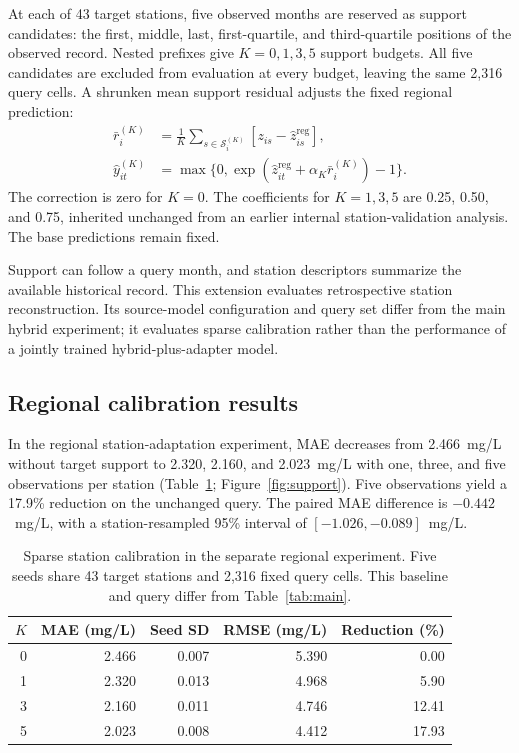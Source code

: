 \documentclass[11pt]{article}
\begin{document}
At each of 43 target stations, five observed months are reserved as support candidates: the first, middle, last, first-quartile, and third-quartile positions of the observed record. Nested prefixes give $K=0,1,3,5$ support budgets. All five candidates are excluded from evaluation at every budget, leaving the same 2,316 query cells. A shrunken mean support residual adjusts the fixed regional prediction:
\begin{align}
 \bar r_i^{(K)}&=\frac{1}{K}\sum_{s\in\mathcal S_i^{(K)}}
       [z_{is}-\hat z_{is}^{\mathrm{reg}}],\\
 \hat y_{it}^{(K)}&=\max\{0,\exp(\hat z_{it}^{\mathrm{reg}}+
                      \alpha_K\bar r_i^{(K)})-1\}.
\end{align}
The correction is zero for $K=0$. The coefficients for $K=1,3,5$ are 0.25, 0.50, and 0.75, inherited unchanged from an earlier internal station-validation analysis. The base predictions remain fixed.

Support can follow a query month, and station descriptors summarize the available historical record. This extension evaluates retrospective station reconstruction. Its source-model configuration and query set differ from the main hybrid experiment; it evaluates sparse calibration rather than the performance of a jointly trained hybrid-plus-adapter model.


\subsection{Regional calibration results}
In the regional station-adaptation experiment, MAE decreases from 2.466~mg/L without target support to 2.320, 2.160, and 2.023~mg/L with one, three, and five observations per station (Table~\ref{tab:support}; Figure~\ref{fig:support}). Five observations yield a 17.9\% reduction on the unchanged query. The paired MAE difference is $-0.442$~mg/L, with a station-resampled 95\% interval of $[-1.026,-0.089]$~mg/L.

\begin{table}[htbp]\centering\small
\caption{Sparse station calibration in the separate regional experiment. Five seeds share 43 target stations and 2,316 fixed query cells. This baseline and query differ from Table~\ref{tab:main}.}
\label{tab:support}
\begin{tabular}{rrrrr}\toprule
$K$ & MAE (mg/L) & Seed SD & RMSE (mg/L) & Reduction (\%)\\\midrule
0 & 2.466 & 0.007 & 5.390 & 0.00\\
1 & 2.320 & 0.013 & 4.968 & 5.90\\
3 & 2.160 & 0.011 & 4.746 & 12.41\\
5 & 2.023 & 0.008 & 4.412 & 17.93\\
\bottomrule\end{tabular}
\end{table}
\end{document}

